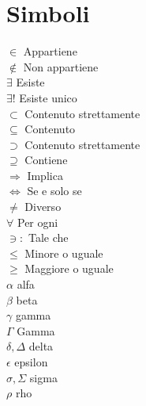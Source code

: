 \section{Simboli}
\begin{multicols}{3}
	$\in$ Appartiene\\
	$\notin$ Non appartiene\\
	$\exists$ Esiste\\
	$\exists !$ Esiste unico\\
	$\subset$ Contenuto strettamente\\
	$\subseteq$ Contenuto\\
	$\supset$ Contenuto strettamente\\
	$\supseteq$ Contiene\\
	$\Rightarrow$ Implica\\
	$\Longleftrightarrow$ Se e solo se\\
	$\neq$ Diverso\\
	$\forall$ Per ogni\\
	$\ni :$ Tale che\\
	$\leq$ Minore o uguale\\
	$\geq$ Maggiore o uguale\\
	$\alpha$ alfa\\
	$\beta$ beta\\
	$\gamma$ gamma\\
	$\Gamma$ Gamma\\
	$\delta,\Delta$ delta\\
	$\epsilon$ epsilon\\
	$\sigma,\Sigma$ sigma\\
	$\rho$ rho
\end{multicols}

